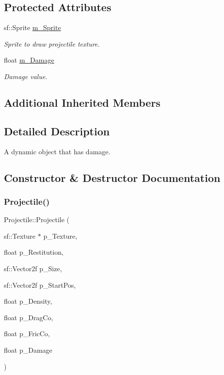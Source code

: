 \subsection*{Protected Attributes}
\begin{DoxyCompactItemize}
\item 
\mbox{\label{class_projectile_a96e6a3198e2a1561ff4b7eaa3e19a378}} 
sf\+::\+Sprite \hyperlink{class_projectile_a96e6a3198e2a1561ff4b7eaa3e19a378}{m\+\_\+\+Sprite}
\begin{DoxyCompactList}\small\item\em Sprite to draw projectile texture. \end{DoxyCompactList}\item 
\mbox{\label{class_projectile_ada5ceb970f091739251d7ae10b94d159}} 
float \hyperlink{class_projectile_ada5ceb970f091739251d7ae10b94d159}{m\+\_\+\+Damage}
\begin{DoxyCompactList}\small\item\em Damage value. \end{DoxyCompactList}\end{DoxyCompactItemize}
\subsection*{Additional Inherited Members}


\subsection{Detailed Description}
A dynamic object that has damage. 

\subsection{Constructor \& Destructor Documentation}
\mbox{\label{class_projectile_a5ed941ee600a7455a2c91fbacec4857e}} 
\subsubsection{\texorpdfstring{Projectile()}{Projectile()}}
{\footnotesize\ttfamily Projectile\+::\+Projectile (\begin{DoxyParamCaption}\item[{sf\+::\+Texture $\ast$}]{p\+\_\+\+Texture,  }\item[{float}]{p\+\_\+\+Restitution,  }\item[{sf\+::\+Vector2f}]{p\+\_\+\+Size,  }\item[{sf\+::\+Vector2f}]{p\+\_\+\+Start\+Pos,  }\item[{float}]{p\+\_\+\+Density,  }\item[{float}]{p\+\_\+\+Drag\+Co,  }\item[{float}]{p\+\_\+\+Fric\+Co,  }\item[{float}]{p\+\_\+\+Damage }\end{DoxyParamCaption})}

